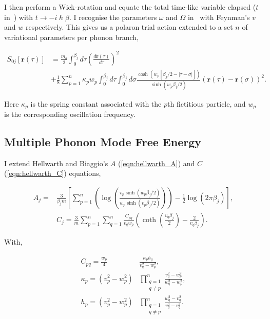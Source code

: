 I then perform a Wick-rotation and equate the total time-like variable elapsed ($t$ in~\cite{poulter_complete_1992}) with $t \rightarrow -i\hslash\beta$. I recognise the parameters $\omega$ and $\Omega$ in~\cite{poulter_complete_1992} with Feynman's $v$ and $w$ respectively. This gives us a polaron trial action extended to a set $n$ of variational parameters per phonon branch,

\begin{equation} \label{eqn:multi_trial_action}
    \begin{split}
        S_{0j}[\mathbf{r}(\tau)] &=
        \frac{m_b}{2}\int^{\beta_j}_0 d\tau \left(\frac{d\mathbf{r}(\tau)}{d\tau}\right)^2 \\
        &+ \frac{1}{8} \sum_{p = 1}^n \kappa_{p} w_{p} \int^{\beta_j}_0 d\tau \int^{\beta_j}_0 d\sigma \frac{\cosh{(w_{p}[\beta_j/2-|\tau-\sigma|])}}{\sinh{(w_{p}\beta_j/2)}}(\mathbf{r}(\tau) - \mathbf{r}(\sigma))^{2} .
    \end{split}
\end{equation}

Here $\kappa_{p}$ is the spring constant associated with the $p$th fictitious particle, and $w_{p}$ is the corresponding oscillation frequency. 

\subsection{Multiple Phonon Mode Free Energy}
\label{subsec:3-1-2}

I extend Hellwarth and Biaggio's $A$ (\ref{eqn:hellwarth_A}) and $C$ (\ref{eqn:hellwarth_C}) equations, 

\begin{subequations}
\begin{align}
    A_j = &\frac{3}{\beta_j m} \left[ \sum_{p = 1}^n \left( \log\left(\frac{v_{p} \sinh (w_{p} \beta_j / 2)}{w_{p} \sinh (v_{p} \beta_j / 2)}\right) \right) - \frac{1}{2} \log \left(2\pi\beta_j\right) \right] , \label{eqn:A} \\
    &C_j = \frac{3}{m} \sum_{p = 1}^n \sum_{q = 1}^n \frac{C_{pq}}{v_{q} w_{p}} \left( \coth \left( \frac{v_{q} \beta_j}{2} \right) - \frac{2}{v_{q} \beta_j} \right) . \label{eqn:C}
\end{align}
\end{subequations}

With, 

\begin{subequations}
    \begin{align}
        C_{pq} = \frac{w_{p}}{4} &\frac{\kappa_{p} h_{q}}{v_{q}^2 - w_{p}^2} ,\\
        \kappa_{p} = \left(v_{p}^2 - w_{p}^2 \right) &\prod\limits_{\substack{q=1 \\ q\neq p}}^n \frac{v_{q}^2 - w_{p}^2}{w_{q}^2 - w_{p}^2} ,\\
        h_{p} = \left( v_{p}^2 - w_{p}^2 \right) &\prod\limits_{\substack{q=1 \\ q\neq p}}^n \frac{w_{q}^2 - v_{q}^2}{v_{q}^2 - v_{q}^2} .
    \end{align}
\end{subequations}

